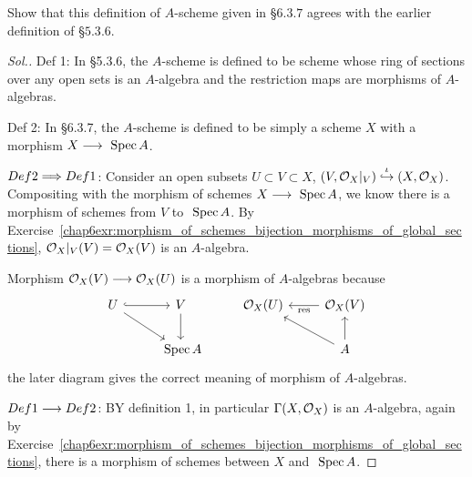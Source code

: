 \documentclass[11pt]{book} %
\begin{document}
\begin{exr}
Show that this definition of $A$-scheme given in \S $6.3.7$ agrees with the earlier definition of \S $5.3.6$.
\end{exr}
\begin{proof}[Sol.]
Def 1: In \S 5.3.6, the $A$-scheme is defined to be scheme whose ring of sections over any  open sets is an $A$-algebra and the restriction maps are morphisms of $A$-algebras.

Def 2: In \S 6.3.7, the $A$-scheme is defined to be simply a scheme $X$ with  a morphism $X\longrightarrow \text{ Spec\,} A$. 

$Def 2\Longrightarrow Def 1$: Consider an open subsets $U\subset V\subset X$, $(V,{\cal O}_X|_V)\overset{\iota}{\hookrightarrow}(X,{\cal O}_X)$. Compositing with the morphism of schemes $X\longrightarrow \text{ Spec\,} A$, we know there is a morphism of schemes from $V$ to $\text{ Spec\,} A$. By Exercise~\ref{chap6exr:morphism_of_schemes_bijection_morphisms_of_global_sections}, ${\cal O}_X|_V(V)={\cal O}_X(V)$ is an $A$-algebra. 

Morphism ${\cal O}_X(V)\longrightarrow{\cal O}_X(U)$ is a morphism of $A$-algebras because
$$
\begin{tikzcd}
U \arrow[r, hook] \arrow[rd] & V \arrow[d] & \calo_X(U) & \calo_X(V) \arrow[l, "\res"] \\
 & \spec A &  & A \arrow[u] \arrow[lu]
\end{tikzcd}
$$
the later diagram gives the correct meaning of morphism of $A$-algebras.

$Def1\longrightarrow Def2$: BY definition 1, in particular $\Gamma(X,{\cal O}_X)$ is an $A$-algebra, again by Exercise~\ref{chap6exr:morphism_of_schemes_bijection_morphisms_of_global_sections}, there is a morphism of schemes between $X$ and $\text{ Spec\,} A$.
\end{proof}
\end{document}
